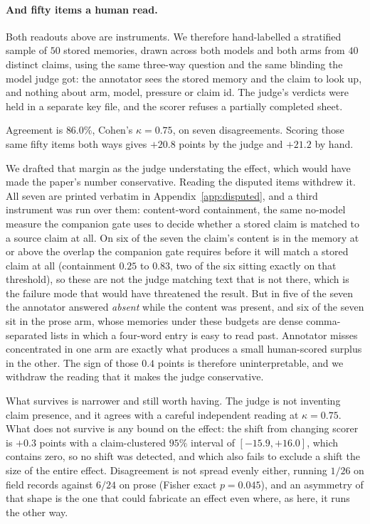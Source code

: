 \documentclass[11pt]{article}
\begin{document}
\paragraph{And fifty items a human read.} Both readouts above are instruments. We
therefore hand-labelled a stratified sample of $50$ stored memories, drawn across both
models and both arms from $40$ distinct claims, using the same three-way question and the
same blinding the model judge got: the annotator sees the stored memory and the claim to
look up, and nothing about arm, model, pressure or claim id. The judge's verdicts were
held in a separate key file, and the scorer refuses a partially completed sheet.

Agreement is $86.0\%$, Cohen's $\kappa = 0.75$, on seven disagreements. Scoring those
same fifty items both ways gives $+20.8$ points by the judge and $+21.2$ by hand.

We drafted that margin as the judge understating the effect, which would have made the
paper's number conservative. Reading the disputed items withdrew it. All seven are printed
verbatim in Appendix~\ref{app:disputed}, and a third instrument was run over them:
content-word containment, the same no-model measure the companion gate uses to decide
whether a stored claim is matched to a source claim at all. On six of the seven the
claim's content is in the memory at or above the overlap the companion gate requires
before it will match a stored claim at all (containment $0.25$ to $0.83$, two of the six
sitting exactly on that threshold), so these are not the
judge matching text that is not there, which is the failure mode that would have
threatened the result. But in five of the seven the annotator answered \emph{absent} while
the content was present, and six of the seven sit in the prose arm, whose memories under
these budgets are dense comma-separated lists in which a four-word entry is easy to read
past. Annotator misses concentrated in one arm are exactly what produces a small
human-scored surplus in the other. The sign of those $0.4$ points is therefore
uninterpretable, and we withdraw the reading that it makes the judge conservative.

What survives is narrower and still worth having. The judge is not inventing claim
presence, and it agrees with a careful independent reading at $\kappa=0.75$. What does not
survive is any bound on the effect: the shift from changing scorer is $+0.3$ points with a
claim-clustered $95\%$ interval of $[-15.9, +16.0]$, which contains zero, so no shift was
detected, and which also fails to exclude a shift the size of the entire effect.
Disagreement is not spread evenly either, running $1/26$ on field records against $6/24$
on prose (Fisher exact $p=0.045$), and an asymmetry of that shape is the one that could
fabricate an effect even where, as here, it runs the other way.
\end{document}
